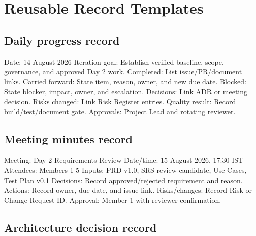 \documentclass[
  10pt,
  a4paper,
  oneside]{report}
\newenvironment{Shaded}{}{}
\newcommand{\NormalTok}[1]{#1}
\begin{document}
\chapter{Reusable Record Templates}\label{28-reusable-record-templates}

\section{Daily progress record}\label{281-daily-progress-record}

\begin{Shaded}
\begin{Highlighting}[]
\NormalTok{Date: 14 August 2026}
\NormalTok{Iteration goal: Establish verified baseline, scope, governance, and approved Day 2 work.}
\NormalTok{Completed: List issue/PR/document links.}
\NormalTok{Carried forward: State item, reason, owner, and new due date.}
\NormalTok{Blocked: State blocker, impact, owner, and escalation.}
\NormalTok{Decisions: Link ADR or meeting decision.}
\NormalTok{Risks changed: Link Risk Register entries.}
\NormalTok{Quality result: Record build/test/document gate.}
\NormalTok{Approvals: Project Lead and rotating reviewer.}
\end{Highlighting}
\end{Shaded}

\section{Meeting minutes record}\label{282-meeting-minutes-record}

\begin{Shaded}
\begin{Highlighting}[]
\NormalTok{Meeting: Day 2 Requirements Review}
\NormalTok{Date/time: 15 August 2026, 17:30 IST}
\NormalTok{Attendees: Members 1{-}5}
\NormalTok{Inputs: PRD v1.0, SRS review candidate, Use Cases, Test Plan v0.1}
\NormalTok{Decisions: Record approved/rejected requirement and reason.}
\NormalTok{Actions: Record owner, due date, and issue link.}
\NormalTok{Risks/changes: Record Risk or Change Request ID.}
\NormalTok{Approval: Member 1 with reviewer confirmation.}
\end{Highlighting}
\end{Shaded}

\section{Architecture decision
record}\label{283-architecture-decision-record}
\end{document}
